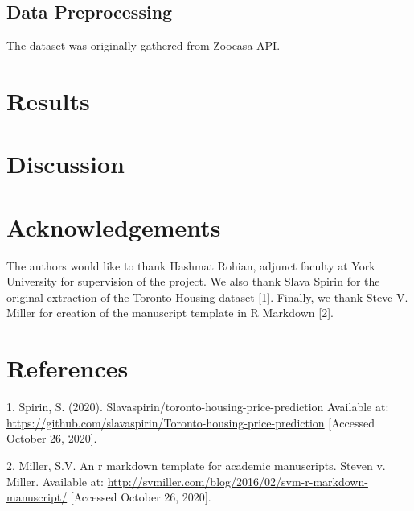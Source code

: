 \documentclass[11pt,]{article}
\begin{document}
\hypertarget{data-preprocessing}{%
\subsection{Data Preprocessing}\label{data-preprocessing}}

The dataset was originally gathered from Zoocasa API.

\hypertarget{results}{%
\section{Results}\label{results}}

\hypertarget{discussion}{%
\section{Discussion}\label{discussion}}

\hypertarget{acknowledgements}{%
\section{Acknowledgements}\label{acknowledgements}}

The authors would like to thank Hashmat Rohian, adjunct faculty at York
University for supervision of the project. We also thank Slava Spirin
for the original extraction of the Toronto Housing dataset {[}1{]}.
Finally, we thank Steve V. Miller for creation of the manuscript
template in R Markdown {[}2{]}.

\hypertarget{references}{%
\section{References}\label{references}}

\noindent

\hypertarget{refs}{}
\leavevmode\hypertarget{ref-spirin_slavaspirintoronto-housing-price-prediction_2020}{}%
1. Spirin, S. (2020). Slavaspirin/toronto-housing-price-prediction
Available at:
\url{https://github.com/slavaspirin/Toronto-housing-price-prediction}
{[}Accessed October 26, 2020{]}.

\leavevmode\hypertarget{ref-miller_r_nodate}{}%
2. Miller, S.V. An r markdown template for academic manuscripts. Steven
v. Miller. Available at:
\url{http://svmiller.com/blog/2016/02/svm-r-markdown-manuscript/}
{[}Accessed October 26, 2020{]}.





\newpage
\singlespacing 
\end{document}
